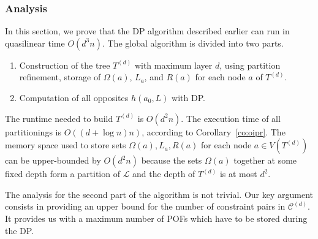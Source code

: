 \documentclass{article}
\begin{document}
\subsubsection{Analysis} \label{subsubsec:analysis_wopp}

In this section, we prove that the DP algorithm described earlier can run in quasilinear time $O(d^3n)$. The global algorithm is divided into two parts.
\begin{enumerate}
\item Construction of the tree $T^{(d)}$ with maximum layer $d$, using partition refinement, storage of $\Omega(a)$, $L_a$, and $R(a)$ for each node $a$ of $T^{(d)}$.
\item Computation of all opposites $h(a_0,L)$ with DP.
\end{enumerate}
The runtime needed to build $T^{(d)}$ is $O(d^2n)$. The execution time of all partitionings is $O((d+\log n)n)$, according to Corollary~\ref{co:oipr}.
The memory space used to store sets $\Omega(a),L_a,R(a)$ for each node $a\in V(T^{(d)})$ can be upper-bounded by $O(d^2n)$ because the sets $\Omega(a)$ together at some fixed depth form a partition of $\mathcal{L}$ and the depth of $T^{(d)}$ is at most $d^2$.

The analysis for the second part of the algorithm is not trivial. Our key argument consists in providing an upper bound for the number of constraint pairs in $\mathcal{C}^{(d)}$. It provides us with a maximum number of POFs which have to be stored during the DP.
\end{document}
